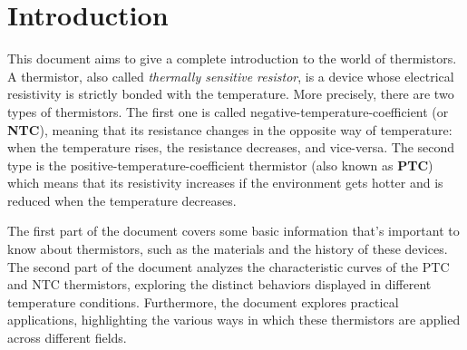 \section{Introduction}
This document aims to give a complete introduction to the world of thermistors. A thermistor, also called \textsl{thermally sensitive resistor}, is a device whose electrical resistivity is strictly bonded with the temperature. More precisely, there are two types of thermistors. The first one is called negative-temperature-coefficient (or \textbf{NTC}), meaning that its resistance changes in the opposite way of temperature: when the temperature rises, the resistance decreases, and vice-versa. The second type is the positive-temperature-coefficient thermistor (also known as \textbf{PTC}) which means that its resistivity increases if the environment gets hotter and is reduced when the temperature decreases.

The first part of the document covers some basic information that's important to know about thermistors, such as the materials and the history of these devices. The second part of the document analyzes the characteristic curves of the PTC and NTC thermistors, exploring the distinct behaviors displayed in different temperature conditions. Furthermore, the document explores practical applications, highlighting the various ways in which these thermistors are applied across different fields.






